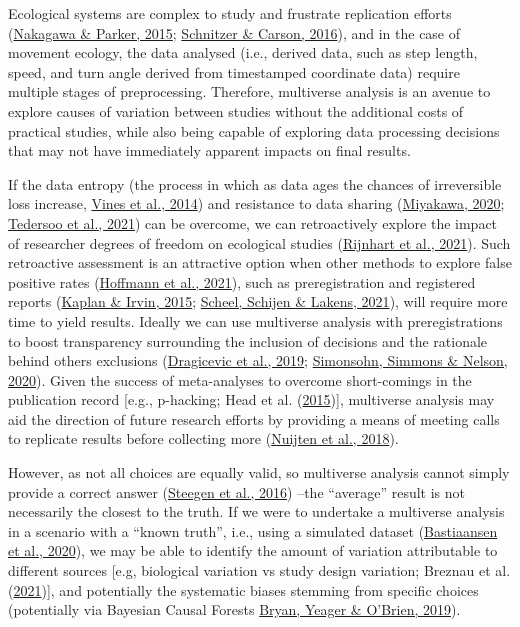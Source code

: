 \documentclass[10pt,a4paper]{article}
\begin{document}
Ecological systems are complex to study and frustrate replication efforts (\protect\hyperlink{ref-nakagawa_replicating_2015}{Nakagawa \& Parker, 2015}; \protect\hyperlink{ref-schnitzer_would_2016}{Schnitzer \& Carson, 2016}), and in the case of movement ecology, the data analysed (i.e., derived data, such as step length, speed, and turn angle derived from timestamped coordinate data) require multiple stages of preprocessing.
Therefore, multiverse analysis is an avenue to explore causes of variation between studies without the additional costs of practical studies, while also being capable of exploring data processing decisions that may not have immediately apparent impacts on final results.

If the data entropy (the process in which as data ages the chances of irreversible loss increase, \protect\hyperlink{ref-vines_availability_2014}{Vines et al., 2014}) and resistance to data sharing (\protect\hyperlink{ref-miyakawa_no_2020}{Miyakawa, 2020}; \protect\hyperlink{ref-tedersoo_data_2021}{Tedersoo et al., 2021}) can be overcome, we can retroactively explore the impact of researcher degrees of freedom on ecological studies (\protect\hyperlink{ref-rijnhart_assessing_2021}{Rijnhart et al., 2021}).
Such retroactive assessment is an attractive option when other methods to explore false positive rates (\protect\hyperlink{ref-hoffmann_multiplicity_2021}{Hoffmann et al., 2021}), such as preregistration and registered reports (\protect\hyperlink{ref-kaplan_likelihood_2015}{Kaplan \& Irvin, 2015}; \protect\hyperlink{ref-scheel_excess_2021}{Scheel, Schijen \& Lakens, 2021}), will require more time to yield results.
Ideally we can use multiverse analysis with preregistrations to boost transparency surrounding the inclusion of decisions and the rationale behind others exclusions (\protect\hyperlink{ref-dragicevic_increasing_2019}{Dragicevic et al., 2019}; \protect\hyperlink{ref-simonsohn_specification_2020}{Simonsohn, Simmons \& Nelson, 2020}).
Given the success of meta-analyses to overcome short-comings in the publication record {[}e.g., p-hacking; Head et al. (\protect\hyperlink{ref-head_extent_2015}{2015}){]}, multiverse analysis may aid the direction of future research efforts by providing a means of meeting calls to replicate results before collecting more (\protect\hyperlink{ref-nuijten_verify_2018}{Nuijten et al., 2018}).

However, as not all choices are equally valid, so multiverse analysis cannot simply provide a correct answer (\protect\hyperlink{ref-steegen_increasing_2016}{Steegen et al., 2016}) --the ``average'' result is not necessarily the closest to the truth.
If we were to undertake a multiverse analysis in a scenario with a ``known truth'', i.e., using a simulated dataset (\protect\hyperlink{ref-bastiaansen_time_2020}{Bastiaansen et al., 2020}), we may be able to identify the amount of variation attributable to different sources {[}e.g, biological variation vs study design variation; Breznau et al. (\protect\hyperlink{ref-breznau_observing_2021}{2021}){]}, and potentially the systematic biases stemming from specific choices (potentially via Bayesian Causal Forests \protect\hyperlink{ref-bryan_replicator_2019}{Bryan, Yeager \& O'Brien, 2019}).
\end{document}
